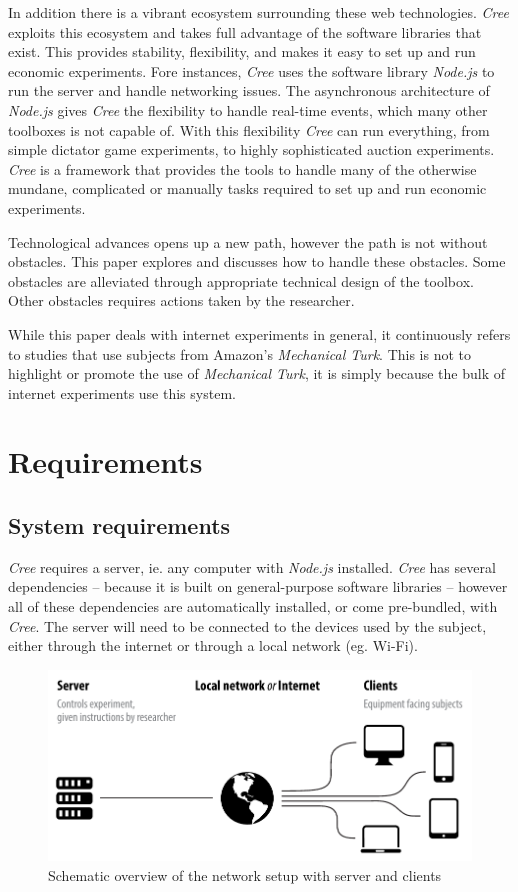 \documentclass[preprint, 12pt]{elsarticle}
\newcommand{\Cree}{\emph{Cree}\xspace}
\begin{document}
In addition there is a vibrant ecosystem surrounding these web technologies. \Cree exploits this ecosystem and takes full advantage of the software libraries that exist. This provides stability, flexibility, and makes it easy to set up and run economic experiments. Fore instances, \Cree uses the software library \emph{Node.js} to run the server and handle networking issues. The asynchronous architecture of \emph{Node.js} gives \Cree the flexibility to handle real-time events, which many other toolboxes is not capable of. With this flexibility \Cree can run everything, from simple dictator game experiments, to highly sophisticated auction experiments. \Cree is a framework that provides the tools to handle many of the otherwise mundane, complicated or manually tasks required to set up and run economic experiments.

Technological advances opens up a new path, however the path is not without obstacles. This paper explores and discusses how to handle these obstacles. Some obstacles are alleviated through appropriate technical design of the toolbox. Other obstacles requires actions taken by the researcher.

While this paper deals with internet experiments in general, it continuously refers to studies that use subjects from Amazon's \emph{Mechanical Turk}. This is not to highlight or promote the use of \emph{Mechanical Turk}, it is simply because the bulk of internet experiments use this system.

\section{Requirements}
\label{S:Requirements}

\subsection{System requirements}

\Cree requires a server, ie. any computer with \emph{Node.js} installed. \Cree has several dependencies -- because it is built on general-purpose software libraries -- however all of these dependencies are automatically installed, or come pre-bundled, with \Cree. The server will need to be connected to the devices used by the subject, either through the internet or through a local network (eg. Wi-Fi). 

\begin{figure}[h!]
  \caption{Schematic overview of the network setup with server and clients}
  \centering
    \includegraphics[width=\textwidth]{figures/setup}
\end{figure}
\end{document}
